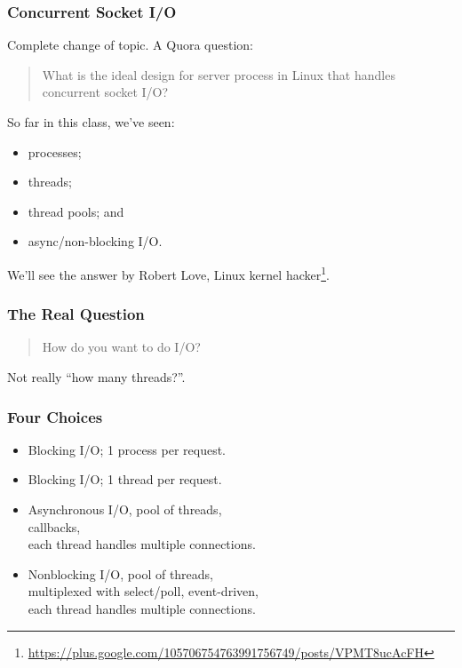\begin{frame}
  \frametitle{Concurrent Socket I/O}

  
    Complete change of topic. A Quora question:

    \begin{quote}
      What is the ideal design for server process in Linux that handles concurrent socket I/O?
    \end{quote}

    So far in this class, we've seen:
    \begin{itemize}
    \item processes;
    \item threads;
    \item thread pools; and
      \item async/non-blocking I/O.
    \end{itemize}

    We'll see the answer by Robert Love, Linux kernel hacker\footnote{\tiny \url{https://plus.google.com/105706754763991756749/posts/VPMT8ucAcFH}}.

  
\end{frame}

\begin{frame}
  \frametitle{The Real Question}

  
    \Large
    \begin{quote}
      How do you want to do I/O?\\[1em]
    \end{quote}

    Not really ``how many threads?''.
  

\end{frame}

\begin{frame}
  \frametitle{Four Choices}

  
    \begin{itemize}
      \item Blocking I/O; 1 process per request.
      \item Blocking I/O; 1 thread per request.
      \item Asynchronous I/O, pool of threads, \\callbacks, \\ each thread handles multiple connections.
      \item Nonblocking I/O, pool of threads, \\ multiplexed with select/poll,
        event-driven, \\ each thread handles multiple connections.
    \end{itemize}
  

\end{frame}

